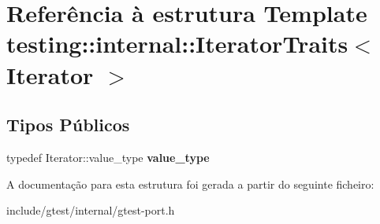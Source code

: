 \hypertarget{structtesting_1_1internal_1_1IteratorTraits}{\section{Referência à estrutura Template testing\-:\-:internal\-:\-:Iterator\-Traits$<$ Iterator $>$}
\label{structtesting_1_1internal_1_1IteratorTraits}
}
\subsection*{Tipos Públicos}
\begin{DoxyCompactItemize}
\item 
\hypertarget{structtesting_1_1internal_1_1IteratorTraits_a29de4320a9c53ce438d3561b94e515bb}{typedef Iterator\-::value\-\_\-type {\bfseries value\-\_\-type}}\label{structtesting_1_1internal_1_1IteratorTraits_a29de4320a9c53ce438d3561b94e515bb}

\end{DoxyCompactItemize}


A documentação para esta estrutura foi gerada a partir do seguinte ficheiro\-:\begin{DoxyCompactItemize}
\item 
include/gtest/internal/gtest-\/port.\-h\end{DoxyCompactItemize}
